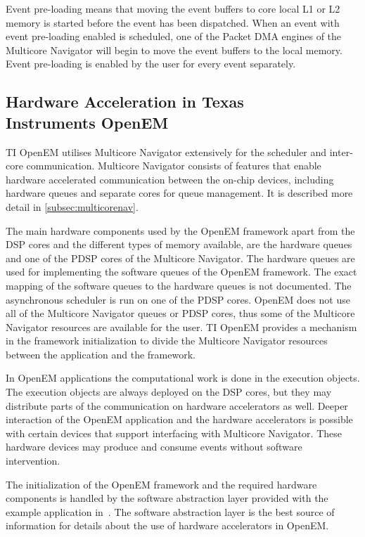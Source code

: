 Event pre-loading means that moving the event buffers to core local L1 or L2 memory is started before the event has been dispatched. When an event with event pre-loading enabled is scheduled, one of the Packet DMA engines of the Multicore Navigator will begin to move the event buffers to the local memory. Event pre-loading is enabled by the user for every event separately.~\cite{moerman2014open}

\subsection[Hardware Acceleration in Texas Instruments OpenEM]{Hardware Acceleration in Texas \\ Instruments OpenEM}
\label{subsec:ti-acceleration}
TI OpenEM utilises Multicore Navigator extensively for the scheduler and inter-core communication. Multicore Navigator consists of features that enable hardware accelerated communication between the on-chip devices, including hardware queues and separate cores for queue management. It is described more detail in \ref{subsec:multicorenav}.

The main hardware components used by the OpenEM framework apart from the DSP cores and the different types of memory available, are the hardware queues and one of the PDSP cores of the Multicore Navigator. The hardware queues are used for implementing the software queues of the OpenEM framework. The exact mapping of the software queues to the hardware queues is not documented. The asynchronous scheduler is run on one of the PDSP cores. OpenEM does not use all of the Multicore Navigator queues or PDSP cores, thus some of the Multicore Navigator resources are available for the user. TI OpenEM provides a mechanism in the framework initialization to divide the Multicore Navigator resources between the application and the framework.~\cite{openemuser}

In OpenEM applications the computational work is done in the execution objects. The execution objects are always deployed on the DSP cores, but they may distribute parts of the communication on hardware accelerators as well. Deeper interaction of the OpenEM application and the hardware accelerators is possible with certain devices that support interfacing with Multicore Navigator. These hardware devices may produce and consume events without software intervention.~\cite{moerman2014open}

The initialization of the OpenEM framework and the required hardware components is handled by the software abstraction layer provided with the example application in~\cite{openemuser}. The software abstraction layer is the best source of information for details about the use of hardware accelerators in OpenEM.

